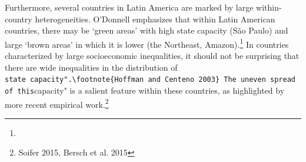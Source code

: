 \documentclass[]{elsarticle} %
\begin{document}
Furthermore, several countries in Latin America are marked by large
within-country heterogeneities. O'Donnell emphasizes that within Latin
American countries, there may be `green areas' with high state capacity
(São Paulo) and large `brown areas' in which it is lower (the Northeast,
Amazon).\footnote{} In countries characterized by large socioeconomic
inequalities, it should not be surprising that there are wide
inequalities in the distribution of
\texttt{state\ capacity".\textbackslash{}footnote\{Hoffman\ and\ Centeno\ 2003\}\ The\ uneven\ spread\ of\ this}capacity"
is a salient feature within these countries, as highlighted by more
recent empirical work.\footnote{Soifer 2015, Bersch et al. 2015}
\end{document}

